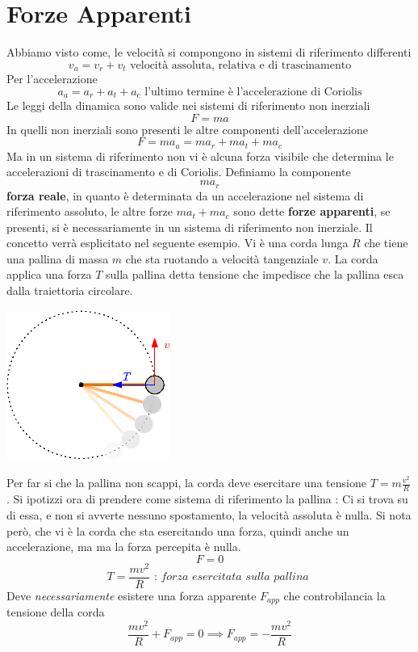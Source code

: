 \documentclass[10pt, letterpaper]{report}
\begin{document}
\section{Forze Apparenti}
Abbiamo visto come, le velocità si compongono in sistemi di riferimento differenti 
$$ v_a=v_r+v_t \text{ velocità assoluta, relativa e di trascinamento}$$
Per l'accelerazione 
$$ a_a=a_r+a_t+a_c \text{ l'ultimo termine è l'accelerazione di Coriolis}$$
Le leggi della dinamica sono valide nei sistemi di riferimento non inerziali 
$$ F=ma$$
In quelli non inerziali sono presenti le altre componenti dell'accelerazione
$$ F=ma_a=ma_r+ma_t+ma_c$$
Ma in un sistema di riferimento non vi è alcuna forza visibile che determina le accelerazioni 
di trascinamento e di Coriolis. Definiamo la componente 
$$ ma_r$$ 
\textbf{forza reale}, in quanto è determinata da un accelerazione nel sistema di riferimento assoluto, le 
altre forze $ma_t+ma_c$ sono dette \textbf{forze apparenti}, se presenti, si è necessariamente in un 
sistema di riferimento non inerziale. Il concetto verrà esplicitato nel seguente esempio.\acc 
Vi è una corda lunga $R$ che tiene una pallina di massa $m$ che sta ruotando a velocità tangenziale $v$. La 
corda applica una forza $T$ sulla pallina detta tensione che impedisce che la pallina esca dalla traiettoria circolare.\begin{center}
    \includegraphics[width=0.4\textwidth]{images/forzaCent.eps}
\end{center}
Per far si che la pallina non scappi, la corda deve esercitare una tensione $T=m\frac{v^2}{R}$. Si ipotizzi ora 
di prendere come sistema di riferimento la pallina : Ci si trova su di essa, e non si avverte nessuno spostamento, 
la velocità assoluta è nulla. Si nota però, che vi è la corda che sta esercitando una forza, quindi anche un accelerazione, ma 
ma la forza percepita è nulla. 
$$ F=0$$
$$ T = \frac{mv^2}{R}\textit{ : forza esercitata sulla pallina }$$
Deve \textit{necessariamente} esistere una forza apparente $F_{app}$ che controbilancia la tensione della corda 
$$ \frac{mv^2}{R} + F_{app} = 0 \implies F_{app}=-\frac{mv^2}{R} $$
\end{document}
